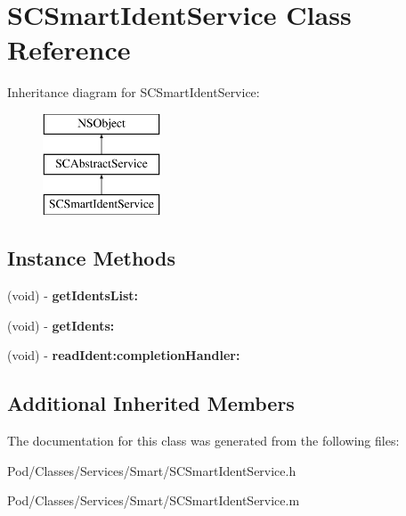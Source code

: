 \hypertarget{interface_s_c_smart_ident_service}{}\section{S\+C\+Smart\+Ident\+Service Class Reference}
\label{interface_s_c_smart_ident_service}
Inheritance diagram for S\+C\+Smart\+Ident\+Service\+:\begin{figure}[H]
\begin{center}
\leavevmode
\includegraphics[height=3.000000cm]{interface_s_c_smart_ident_service}
\end{center}
\end{figure}
\subsection*{Instance Methods}
\begin{DoxyCompactItemize}
\item 
(void) -\/ {\bfseries get\+Idents\+List\+:}\hypertarget{interface_s_c_smart_ident_service_a5cd68715916f28967ba5c3434f60528f}{}\label{interface_s_c_smart_ident_service_a5cd68715916f28967ba5c3434f60528f}

\item 
(void) -\/ {\bfseries get\+Idents\+:}\hypertarget{interface_s_c_smart_ident_service_aed8badcffcd06ab336ebf71996020c6a}{}\label{interface_s_c_smart_ident_service_aed8badcffcd06ab336ebf71996020c6a}

\item 
(void) -\/ {\bfseries read\+Ident\+:completion\+Handler\+:}\hypertarget{interface_s_c_smart_ident_service_acfe9e760505e6914958b19b3c157b45d}{}\label{interface_s_c_smart_ident_service_acfe9e760505e6914958b19b3c157b45d}

\end{DoxyCompactItemize}
\subsection*{Additional Inherited Members}


The documentation for this class was generated from the following files\+:\begin{DoxyCompactItemize}
\item 
Pod/\+Classes/\+Services/\+Smart/S\+C\+Smart\+Ident\+Service.\+h\item 
Pod/\+Classes/\+Services/\+Smart/S\+C\+Smart\+Ident\+Service.\+m\end{DoxyCompactItemize}
